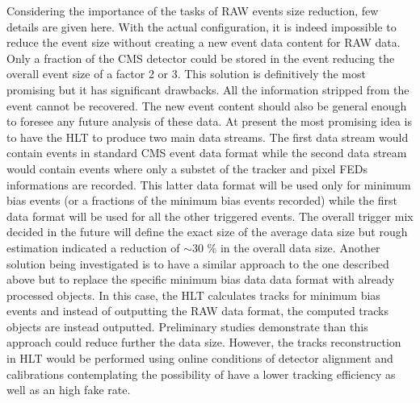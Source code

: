 Considering the importance of the tasks of RAW events size reduction, few details are given here. With the actual configuration, it is indeed impossible to reduce the event size without creating a new event data content for RAW data. Only a fraction of the CMS detector could be stored in the event reducing the overall event size of a factor 2 or 3. This solution is definitively the most promising but it has significant drawbacks. All the information stripped from the event cannot be recovered. The new event content should also be general enough to foresee any future analysis of these data. At present the most promising idea is to have the HLT to produce two main data streams. The first data stream would contain events in standard CMS event data format while the second data stream would contain events where only a substet of the tracker and pixel FEDs informations are recorded. This latter data format will be used only for minimum bias events (or a fractions of the minimum bias events recorded) while the first data format will be used for all the other triggered events. The overall trigger mix decided in the future will define the exact size of the average data size but rough estimation indicated a reduction of $\sim 30$ \% in the overall data size. Another solution being investigated is to have a similar approach to the one described above but to replace the specific minimum bias data data format with already processed objects. In this case, the HLT calculates tracks for minimum bias events and instead of outputting the RAW data format, the computed tracks objects are instead outputted. Preliminary studies demonstrate than this approach could reduce further the data size. However, the tracks reconstruction in HLT would be performed using online conditions of detector alignment and calibrations contemplating the possibility of have a lower tracking efficiency as well as an high fake rate. 





